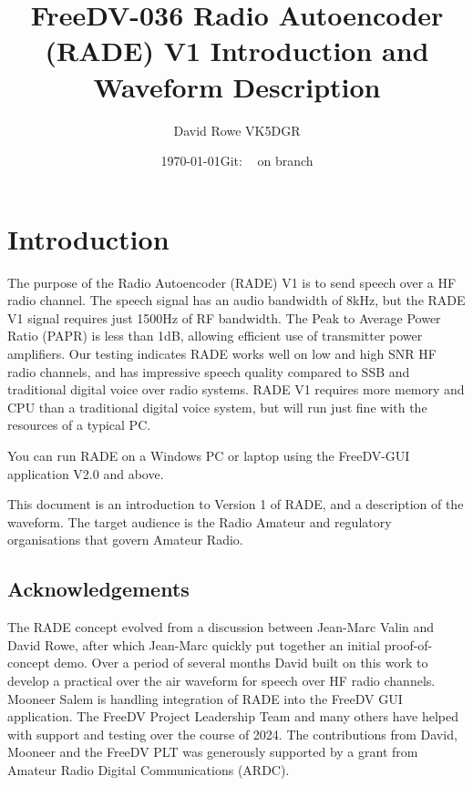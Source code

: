 \documentclass{article}
\newcommand{\commit}{\dots~(in \emph{packed-refs})}}
\newcommand{\gitrevision}{%
  \StrLeft{\commit}{7}%
}
\begin{document}


\title{FreeDV-036 Radio Autoencoder (RADE) V1 Introduction and Waveform Description}
\author{David Rowe VK5DGR}
\date{\today \quad Git: \texttt{\gitrevision} on branch \texttt{\branch}\\}
\maketitle

\section{Introduction}

The purpose of the Radio Autoencoder (RADE) V1 is to send speech over a HF radio channel. The speech signal has an audio bandwidth of 8kHz, but the RADE V1 signal requires just 1500Hz of RF bandwidth. The Peak to Average Power Ratio (PAPR) is less than 1dB, allowing efficient use of transmitter power amplifiers. Our testing indicates RADE works well on low and high SNR HF radio channels, and has impressive speech quality compared to SSB and traditional digital voice over radio systems. RADE V1 requires more memory and CPU than a traditional digital voice system, but will run just fine with the resources of a typical PC.

You can run RADE on a Windows PC or laptop using the FreeDV-GUI application V2.0 and above.

This document is an introduction to Version 1 of RADE, and a description of the waveform. The target audience is the Radio Amateur and regulatory organisations that govern Amateur Radio.

\subsection{Acknowledgements}

The RADE concept evolved from a discussion between Jean-Marc Valin and David Rowe, after which Jean-Marc quickly put together an initial proof-of-concept demo. Over a period of several months David built on this work to develop a practical over the air waveform for speech over HF radio channels.  Mooneer Salem is handling integration of RADE into the FreeDV GUI application. The FreeDV Project Leadership Team and many others have helped with support and testing over the course of 2024. The contributions from David, Mooneer and the FreeDV PLT was generously supported by a grant from Amateur Radio Digital Communications (ARDC).
\end{document}

